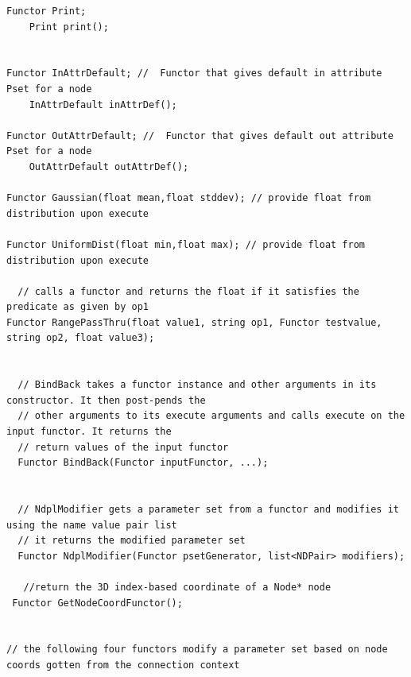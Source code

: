 \begin{verbatim}
Functor Print;
    Print print();


Functor InAttrDefault; //  Functor that gives default in attribute Pset for a node  
    InAttrDefault inAttrDef(); 
    
Functor OutAttrDefault; //  Functor that gives default out attribute Pset for a node
    OutAttrDefault outAttrDef();
    
Functor Gaussian(float mean,float stddev); // provide float from distribution upon execute
    
Functor UniformDist(float min,float max); // provide float from distribution upon execute 

  // calls a functor and returns the float if it satisfies the predicate as given by op1
Functor RangePassThru(float value1, string op1, Functor testvalue, string op2, float value3); 


  // BindBack takes a functor instance and other arguments in its constructor. It then post-pends the
  // other arguments to its execute arguments and calls execute on the input functor. It returns the
  // return values of the input functor
  Functor BindBack(Functor inputFunctor, ...);


  // NdplModifier gets a parameter set from a functor and modifies it using the name value pair list
  // it returns the modified parameter set
  Functor NdplModifier(Functor psetGenerator, list<NDPair> modifiers);

   //return the 3D index-based coordinate of a Node* node
 Functor GetNodeCoordFunctor();


// the following four functors modify a parameter set based on node coords gotten from the connection context


\end{verbatim}

